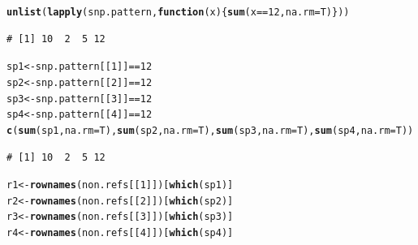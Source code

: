 \documentclass{article}\usepackage[]{graphicx}\usepackage[]{color}
\makeatletter
\newcommand{\hlnum}[1]{\textcolor[rgb]{0.686,0.059,0.569}{#1}}%
\newcommand{\hlopt}[1]{\textcolor[rgb]{0,0,0}{#1}}%
\newcommand{\hlstd}[1]{\textcolor[rgb]{0.345,0.345,0.345}{#1}}%
\newcommand{\hlkwa}[1]{\textcolor[rgb]{0.161,0.373,0.58}{\textbf{#1}}}%
\newcommand{\hlkwb}[1]{\textcolor[rgb]{0.69,0.353,0.396}{#1}}%
\newcommand{\hlkwc}[1]{\textcolor[rgb]{0.333,0.667,0.333}{#1}}%
\newcommand{\hlkwd}[1]{\textcolor[rgb]{0.737,0.353,0.396}{\textbf{#1}}}%
\newenvironment{kframe}{%
 \def\at@end@of@kframe{}%
 \ifinner\ifhmode%
  \def\at@end@of@kframe{\end{minipage}}%
  \begin{minipage}{\columnwidth}%
 \fi\fi%
 \def\FrameCommand##1{\hskip\@totalleftmargin \hskip-\fboxsep
 \colorbox{shadecolor}{##1}\hskip-\fboxsep
     \hskip-\linewidth \hskip-\@totalleftmargin \hskip\columnwidth}%
 \MakeFramed {\advance\hsize-\width
   \@totalleftmargin\z@ \linewidth\hsize
   \@setminipage}}%
 {\par\unskip\endMakeFramed%
 \at@end@of@kframe}
\newenvironment{knitrout}{}{} %
\makeatother
\begin{document}
\begin{knitrout}\footnotesize
{}\color{fgcolor}\begin{kframe}
\begin{alltt}
\hlkwd{unlist}\hlstd{(}\hlkwd{lapply}\hlstd{(snp.pattern,}\hlkwa{function}\hlstd{(}\hlkwc{x}\hlstd{)\{}\hlkwd{sum}\hlstd{(x}\hlopt{==}\hlnum{12}\hlstd{,}\hlkwc{na.rm}\hlstd{=T)\}))}
\end{alltt}
\begin{verbatim}
# [1] 10  2  5 12
\end{verbatim}
\begin{alltt}
\hlstd{sp1} \hlkwb{<-} \hlstd{snp.pattern[[}\hlnum{1}\hlstd{]]}\hlopt{==}\hlnum{12}
\hlstd{sp2} \hlkwb{<-} \hlstd{snp.pattern[[}\hlnum{2}\hlstd{]]}\hlopt{==}\hlnum{12}
\hlstd{sp3} \hlkwb{<-} \hlstd{snp.pattern[[}\hlnum{3}\hlstd{]]}\hlopt{==}\hlnum{12}
\hlstd{sp4} \hlkwb{<-} \hlstd{snp.pattern[[}\hlnum{4}\hlstd{]]}\hlopt{==}\hlnum{12}
\hlkwd{c}\hlstd{(}\hlkwd{sum}\hlstd{(sp1,}\hlkwc{na.rm}\hlstd{=T),} \hlkwd{sum}\hlstd{(sp2,}\hlkwc{na.rm}\hlstd{=T),} \hlkwd{sum}\hlstd{(sp3,}\hlkwc{na.rm}\hlstd{=T),} \hlkwd{sum}\hlstd{(sp4,}\hlkwc{na.rm}\hlstd{=T))}
\end{alltt}
\begin{verbatim}
# [1] 10  2  5 12
\end{verbatim}
\begin{alltt}
\hlstd{r1} \hlkwb{<-} \hlkwd{rownames}\hlstd{(non.refs[[}\hlnum{1}\hlstd{]])[}\hlkwd{which}\hlstd{(sp1)]}
\hlstd{r2} \hlkwb{<-} \hlkwd{rownames}\hlstd{(non.refs[[}\hlnum{2}\hlstd{]])[}\hlkwd{which}\hlstd{(sp2)]}
\hlstd{r3} \hlkwb{<-} \hlkwd{rownames}\hlstd{(non.refs[[}\hlnum{3}\hlstd{]])[}\hlkwd{which}\hlstd{(sp3)]}
\hlstd{r4} \hlkwb{<-} \hlkwd{rownames}\hlstd{(non.refs[[}\hlnum{4}\hlstd{]])[}\hlkwd{which}\hlstd{(sp4)]}


\end{alltt}
\end{kframe}
\end{knitrout}
\end{document}
